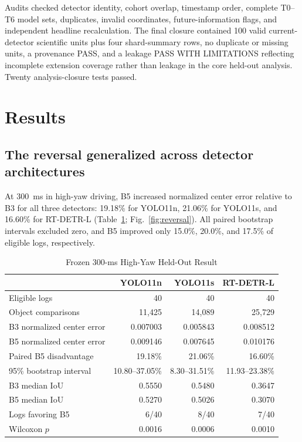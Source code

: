 \documentclass[journal]{IEEEtran}
\begin{document}
Audits checked detector identity, cohort overlap, timestamp order, complete T0--T6 model sets, duplicates, invalid coordinates, future-information flags, and independent headline recalculation. The final closure contained 100 valid current-detector scientific units plus four shard-summary rows, no duplicate or missing units, a provenance PASS, and a leakage PASS WITH LIMITATIONS reflecting incomplete extension coverage rather than leakage in the core held-out analysis. Twenty analysis-closure tests passed.

\section{Results}
\subsection{The reversal generalized across detector architectures}
At 300~ms in high-yaw driving, B5 increased normalized center error relative to B3 for all three detectors: 19.18\% for YOLO11n, 21.06\% for YOLO11s, and 16.60\% for RT-DETR-L (Table~\ref{tab:primary}; Fig.~\ref{fig:reversal}). All paired bootstrap intervals excluded zero, and B5 improved only 15.0\%, 20.0\%, and 17.5\% of eligible logs, respectively.

\begin{table}[t]
\caption{Frozen 300-ms High-Yaw Held-Out Result}
\label{tab:primary}
\centering
\footnotesize
\begin{tabular}{@{}lrrr@{}}
\toprule
 & YOLO11n & YOLO11s & RT-DETR-L \\
\midrule
Eligible logs & 40 & 40 & 40 \\
Object comparisons & 11,425 & 14,089 & 25,729 \\
B3 normalized center error & 0.007003 & 0.005843 & 0.008512 \\
B5 normalized center error & 0.009146 & 0.007645 & 0.010176 \\
Paired B5 disadvantage & 19.18\% & 21.06\% & 16.60\% \\
95\% bootstrap interval & 10.80--37.05\% & 8.30--31.51\% & 11.93--23.38\% \\
B3 median IoU & 0.5550 & 0.5480 & 0.3647 \\
B5 median IoU & 0.5270 & 0.5026 & 0.3070 \\
Logs favoring B5 & 6/40 & 8/40 & 7/40 \\
Wilcoxon $p$ & 0.0016 & 0.0006 & 0.0010 \\
\bottomrule
\end{tabular}
\end{table}
\end{document}

